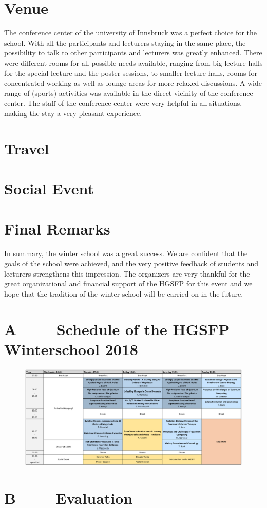 \section*{Venue}
The conference center of the university of Innsbruck was a perfect choice for the school. With all the participants and lecturers staying in the same place, the possibility to talk to other participants and lecturers was greatly enhanced. There were different rooms for all possible needs available, ranging from big lecture halls for the special lecture and the poster sessions, to smaller lecture halls, rooms for concentrated working as well as lounge areas for more relaxed discussions. A wide range of (sports) activities was available in the direct vicinity of the conference center. The staff of the conference center were very helpful in all situations, making the stay a very pleasant experience.


\section*{Travel}


\section*{Social Event}


\section*{Final Remarks}
In summary, the winter school was a great success. We are confident that the goals of the school were achieved, and the very positive feedback of students and lecturers strengthens this impression. The organizers are very thankful for the great organizational and financial support of the HGSFP for this event and we hope that the tradition of the winter school will be carried on in the future.


\newpage
\section*{A $\qquad$ Schedule of the HGSFP Winterschool 2018}

\begin{figure}[h!]
\centering
\includegraphics[scale=0.66, angle = 90 ]{figures/Program.jpg}
\end{figure}


\section*{B $\qquad$ Evaluation}

\newpage